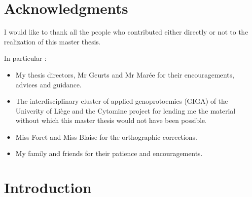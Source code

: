 \documentclass[a4paper]{report}
\begin{document}
\newpage 


\chapter*{Acknowledgments}
\thispagestyle{empty}
\par
I would like to thank all the people who contributed either directly or not to the realization of this master thesis.
\par
In particular : 
\begin{itemize}
	\item My thesis directors, Mr Geurts and Mr Marée for their encouragements, advices and guidance.
	\item The interdisciplinary cluster of applied genoprotoemics (GIGA) of the Univerity of Liège and the Cytomine project for lending me the material without which this master thesis would not have been possible.
	\item Miss Foret and Miss Blaise for the orthographic corrections.
	\item My family and friends for their patience and encouragements. 
\end{itemize}

\newpage 

\thispagestyle{empty}
\tableofcontents
\thispagestyle{empty}
\newpage

\chapter{Introduction}
\end{document}
